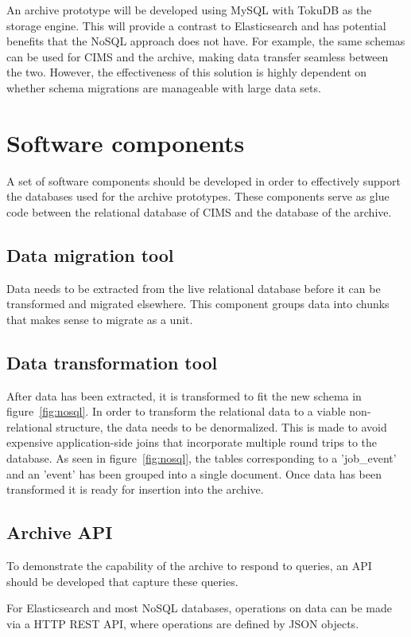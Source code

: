 An archive prototype will be developed using MySQL with TokuDB as the storage engine. This will provide a contrast to Elasticsearch and has potential benefits that the NoSQL approach does not have. For example, the same schemas can be used for CIMS and the archive, making data transfer seamless between the two. However, the effectiveness of this solution is highly dependent on whether schema migrations are manageable with large data sets.

\section{Software components}
A set of software components should be developed in order to effectively support the databases used for the archive prototypes. These components serve as glue code between the relational database of CIMS and the database of the archive. 
\subsection{Data migration tool}
Data needs to be extracted from the live relational database before it can be transformed and migrated elsewhere. This component groups data into chunks that makes sense to migrate as a unit. 

\subsection{Data transformation tool}
After data has been extracted, it is transformed to fit the new schema in figure~\ref{fig:nosql}. In order to transform the relational data to a viable non-relational structure, the data needs to be denormalized. This is made to avoid expensive application-side joins that incorporate multiple round trips to the database. As seen in figure~\ref{fig:nosql}, the tables corresponding to a 'job\_event' and an 'event' has been grouped into a single document. Once data has been transformed it is ready for insertion into the archive. 

\subsection{Archive API}
\label{sec:archiveapi}
To demonstrate the capability of the archive to respond to queries, an API should be developed that capture these queries. 

For Elasticsearch and most NoSQL databases, operations on data can be made via a HTTP REST API, where operations are defined by JSON objects.

